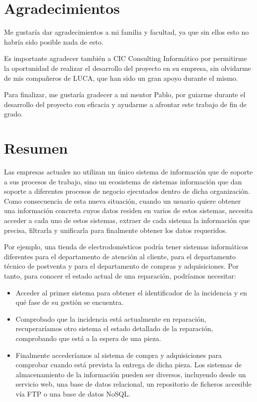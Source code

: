 \chapter*{Agradecimientos}
	Me gustaría dar agradecimientos a mi familia y facultad, ya que sin ellos esto no habría sido posible nada de esto.
	
	 Es importante agradecer también a CIC Consulting Informático por permitirme la oportunidad de realizar el desarrollo del proyecto en su empresa, sin olvidarme de mis compañeros de LUCA, que han sido un gran apoyo durante el mismo.
	
	 Para finalizar, me gustaría gradecer a mi mentor Pablo, por guiarme durante el desarrollo del proyecto con eficacia y ayudarme a afrontar este trabajo de fin de grado.

	
	\chapter*{Resumen}
	Las empresas actuales no utilizan un único sistema de información que de soporte a sus procesos de trabajo, sino un  ecosistema de sistemas información que dan soporte a diferentes procesos de negocio ejecutados dentro de dicha organización. Como consecuencia de esta nueva situación, cuando un usuario	quiere obtener una información concreta cuyos datos residen en varios de estos
	sistemas, necesita acceder a cada uno de estos sistemas, extraer de cada sistema la información que precisa, filtrarla y unificarla para finalmente	obtener los datos requeridos.
	
	
	Por ejemplo, una tienda de electrodomésticos podría tener sistemas informáticos diferentes para el departamento de atención al cliente, para el departamento técnico de postventa y para el departamento de compras y adquisiciones. Por tanto, para conocer el estado actual de una reparación, podríamos necesitar:
		\begin{itemize}
			\item  Acceder al primer sistema para obtener el identificador de la incidencia y en qué fase de su gestión se encuentra.
			\item  Comprobado que la incidencia está actualmente en reparación, recuperaríamos otro sistema el estado detallado de la reparación, comprobando que está a la espera de una pieza.
			\item Finalmente accederíamos al sistema de compra y adquisiciones para comprobar cuando está prevista la entrega de dicha pieza. Los sistemas de almacenamiento de la información pueden ser diversos, incluyendo desde un servicio web, una base de datos relacional, un repositorio de ficheros accesible vía FTP o una base de datos NoSQL.
		\end{itemize}
	
